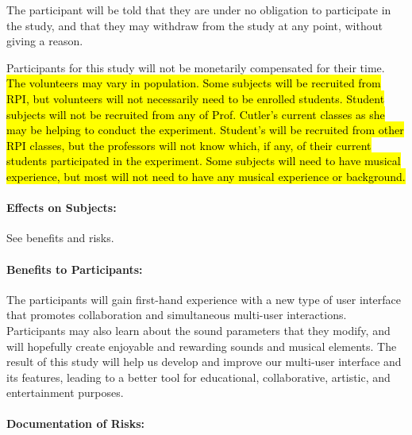 \documentclass[10pt]{article}
\begin{document}
The participant will be told that they are under no obligation to
participate in the study, and that they may withdraw from the study at
any point, without giving a reason.  

Participants for this study will not be monetarily compensated for their time.
\hl{The volunteers may vary in population. Some subjects will be recruited from
RPI, but volunteers will not necessarily need to be enrolled students. 
Student subjects will not be recruited from any of Prof. Cutler's current
classes as she may be helping to conduct the experiment. Student's will be
recruited from other RPI classes, but the professors will not know which, if
any, of their current students participated in the experiment.
Some subjects will need to have musical experience, but most will not need 
to have any musical experience or background.} 

\paragraph{Effects on Subjects:}
%
See benefits and risks.

\paragraph{Benefits to Participants:}
The participants will gain first-hand experience with a new type of user interface 
that promotes collaboration and simultaneous multi-user interactions. 
Participants may also learn about the sound parameters that they modify, 
and will hopefully create enjoyable and rewarding sounds and musical elements. 
The result of this study will help us develop and improve our multi-user interface 
and its features, leading to a better tool for educational, collaborative, artistic, 
and entertainment purposes.

\paragraph{Documentation of Risks:}   
\end{document}
